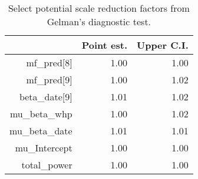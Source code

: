 \begin{table}[h]
\centering
\begin{tabular}{rrr}
  \hline
 & Point est. & Upper C.I. \\ 
  \hline
mf\_pred[8] & 1.00 & 1.00 \\ 
  mf\_pred[9] & 1.00 & 1.02 \\ 
  beta\_date[9] & 1.01 & 1.02 \\ 
  mu\_beta\_whp & 1.00 & 1.02 \\ 
  mu\_beta\_date & 1.01 & 1.01 \\ 
  mu\_Intercept & 1.00 & 1.00 \\ 
  total\_power & 1.00 & 1.00 \\ 
   \hline
\end{tabular}
\caption{Select potential scale reduction factors from Gelman's diagnostic test.} 
\label{tab:gelman}
\end{table}
